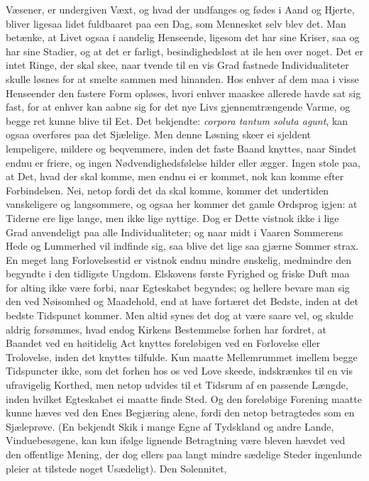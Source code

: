 \documentclass[12pt,a4paper]{book}
\newcommand{\apage}[1]{\marginnote{\footnotesize\textit{[#1]}}}
\begin{document}
Væsener, er undergiven Væxt, og hvad der undfanges og fødes i Aand og
Hjerte, bliver ligesaa lidet fuldbaaret paa een Dag, som Mennesket selv
blev det. Man betænke, at Livet ogsaa i aandelig Henseende, ligesom det
har sine Kriser, saa og har sine Stadier, og at det er farligt,
besindighedsløst at ile hen over noget. Det er intet Ringe, der skal
skee, naar tvende til en vis Grad fastnede Individualiteter skulle
løsnes for at smelte sammen med hinanden. Hos enhver af dem maa i visse
Henseender den fastere Form opløses, hvori enhver maaskee allerede havde
sat sig fast, \apage{82} for at enhver kan aabne sig for det nye Livs
gjennemtrængende Varme, og begge ret kunne blive til Eet. Det bekjendte:
\textit{corpora tantum soluta agunt}, kan ogsaa overføres paa det Sjælelige. Men
denne Løsning skeer ei sjeldent lempeligere, mildere og beqvemmere,
inden det faste Baand knyttes, naar Sindet endnu er friere, og ingen
Nødvendighedsfølelse hilder eller ægger. Ingen stole paa, at Det, hvad
der skal komme, men endnu ei er kommet, nok kan komme efter
Forbindelsen. Nei, netop fordi det da skal komme, kommer det undertiden
vanskeligere og langsommere, og ogsaa her kommer det gamle Ordsprog
igjen: at Tiderne ere lige lange, men ikke lige nyttige. Dog er Dette
vistnok ikke i lige Grad anvendeligt paa alle Individualiteter; og naar
midt i Vaaren Sommerens Hede og Lummerhed vil indfinde sig, saa blive
det lige saa gjærne Sommer strax. En meget lang Forlovelsestid er
vistnok endnu mindre ønskelig, medmindre den begyndte i den tidligste
Ungdom. Elskovens første Fyrighed og friske Duft maa for alting ikke
være forbi, naar Egteskabet begyndes; og hellere bevare man sig den ved
Nøisomhed og Maadehold, end at have fortæret det Bedste, inden at det
bedste Tidspunct kommer. Men altid synes det dog at være saare vel, og
skulde aldrig forsømmes, hvad endog Kirkens Bestemmelse forhen har
fordret, at Baandet ved en høitidelig Act knyttes foreløbigen ved en
Forlovelse eller Trolovelse, inden det knyttes tilfulde. Kun maatte
Mellemrummet imellem begge Tidspuncter ikke, som det \apage{83} forhen hos os ved
Love skeede, indskrænkes til en vis ufravigelig Korthed, men netop
udvides til et Tidsrum af en passende Længde, inden hvilket Egteskabet
ei maatte finde Sted. Og den foreløbige Forening maatte kunne hæves ved
den Enes Begjæring alene, fordi den netop betragtedes som en Sjæleprøve.
(En bekjendt Skik i mange Egne af Tydskland og andre Lande,
Vinduebesøgene, kan kun ifølge lignende Betragtning være bleven hævdet
ved den offentlige Mening, der dog ellers paa langt mindre sædelige
Steder ingenlunde pleier at tilstede noget Usædeligt). Den Solennitet,
\end{document}
